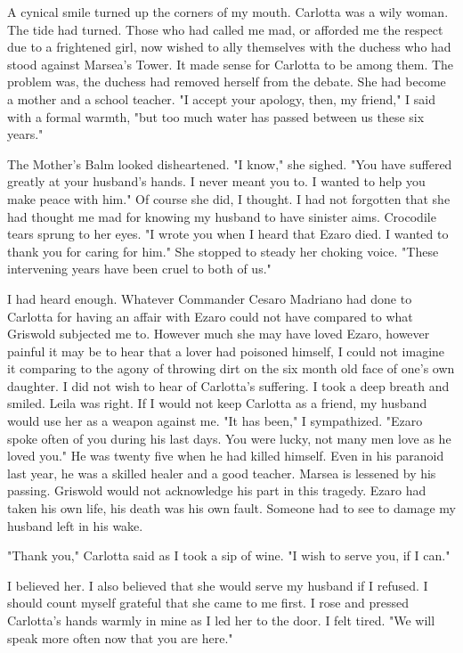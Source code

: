 \documentclass{article}
\begin{document}
A cynical smile turned up the corners of my mouth. Carlotta was a wily woman. The tide had turned. Those who had called me mad, or afforded me the respect due to a frightened girl, now wished to ally themselves with the duchess who had stood against Marsea's Tower. It made sense for Carlotta to be among them. The problem was, the duchess had removed herself from the debate. She had become a mother and a school teacher. "I accept your apology, then, my friend," I said with a formal warmth, "but too much water has passed between us these six years."

The Mother's Balm looked disheartened. "I know," she sighed. "You have suffered greatly at your husband's hands. I never meant you to. I wanted to help you make peace with him." Of course she did, I thought. I had not forgotten that she had thought me mad for knowing my husband to have sinister aims. Crocodile tears sprung to her eyes. "I wrote you when I heard that Ezaro died. I wanted to thank you for caring for him." She stopped to steady her choking voice. "These intervening years have been cruel to both of us."

I had heard enough. Whatever Commander Cesaro Madriano had done to Carlotta for having an affair with Ezaro could not have compared to what Griswold subjected me to. However much she may have loved Ezaro, however painful it may be to hear that a lover had poisoned himself, I could not imagine it comparing to the agony of throwing dirt on the six month old face of one's own daughter. I did not wish to hear of Carlotta's suffering. I took a deep breath and smiled. Leila was right. If I would not keep Carlotta as a friend, my husband would use her as a weapon against me. "It has been," I sympathized. "Ezaro spoke often of you during his last days. You were lucky, not many men love as he loved you." He was twenty five when he had killed himself. Even in his paranoid last year, he was a skilled healer and a good teacher. Marsea is lessened by his passing. Griswold would not acknowledge his part in this tragedy. Ezaro had taken his own life, his death was his own fault. Someone had to see to damage my husband left in his wake.

"Thank you," Carlotta said as I took a sip of wine. "I wish to serve you, if I can." 

I believed her. I also believed that she would serve my husband if I refused. I should count myself grateful that she came to me first. I rose and pressed Carlotta's hands warmly in mine as I led her to the door. I felt tired. "We will speak more often now that you are here."
\end{document}
